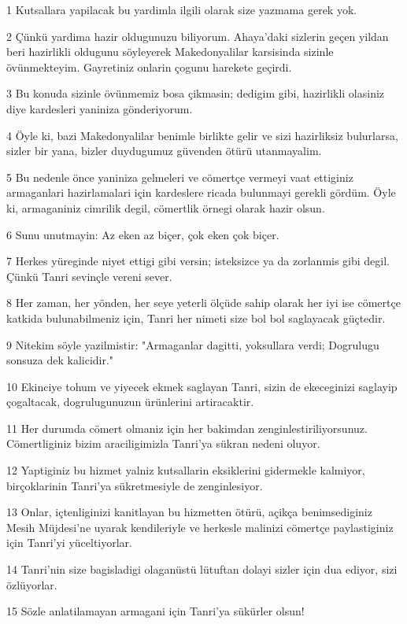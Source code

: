 \par 1 Kutsallara yapilacak bu yardimla ilgili olarak size yazmama gerek yok.
\par 2 Çünkü yardima hazir oldugunuzu biliyorum. Ahaya'daki sizlerin geçen yildan beri hazirlikli oldugunu söyleyerek Makedonyalilar karsisinda sizinle övünmekteyim. Gayretiniz onlarin çogunu harekete geçirdi.
\par 3 Bu konuda sizinle övünmemiz bosa çikmasin; dedigim gibi, hazirlikli olasiniz diye kardesleri yaniniza gönderiyorum.
\par 4 Öyle ki, bazi Makedonyalilar benimle birlikte gelir ve sizi hazirliksiz bulurlarsa, sizler bir yana, bizler duydugumuz güvenden ötürü utanmayalim.
\par 5 Bu nedenle önce yaniniza gelmeleri ve cömertçe vermeyi vaat ettiginiz armaganlari hazirlamalari için kardeslere ricada bulunmayi gerekli gördüm. Öyle ki, armaganiniz cimrilik degil, cömertlik örnegi olarak hazir olsun.
\par 6 Sunu unutmayin: Az eken az biçer, çok eken çok biçer.
\par 7 Herkes yüreginde niyet ettigi gibi versin; isteksizce ya da zorlanmis gibi degil. Çünkü Tanri sevinçle vereni sever.
\par 8 Her zaman, her yönden, her seye yeterli ölçüde sahip olarak her iyi ise cömertçe katkida bulunabilmeniz için, Tanri her nimeti size bol bol saglayacak güçtedir.
\par 9 Nitekim söyle yazilmistir: "Armaganlar dagitti, yoksullara verdi; Dogrulugu sonsuza dek kalicidir."
\par 10 Ekinciye tohum ve yiyecek ekmek saglayan Tanri, sizin de ekeceginizi saglayip çogaltacak, dogrulugunuzun ürünlerini artiracaktir.
\par 11 Her durumda cömert olmaniz için her bakimdan zenginlestiriliyorsunuz. Cömertliginiz bizim araciligimizla Tanri'ya sükran nedeni oluyor.
\par 12 Yaptiginiz bu hizmet yalniz kutsallarin eksiklerini gidermekle kalmiyor, birçoklarinin Tanri'ya sükretmesiyle de zenginlesiyor.
\par 13 Onlar, içtenliginizi kanitlayan bu hizmetten ötürü, açikça benimsediginiz Mesih Müjdesi'ne uyarak kendileriyle ve herkesle malinizi cömertçe paylastiginiz için Tanri'yi yüceltiyorlar.
\par 14 Tanri'nin size bagisladigi olaganüstü lütuftan dolayi sizler için dua ediyor, sizi özlüyorlar.
\par 15 Sözle anlatilamayan armagani için Tanri'ya sükürler olsun!

